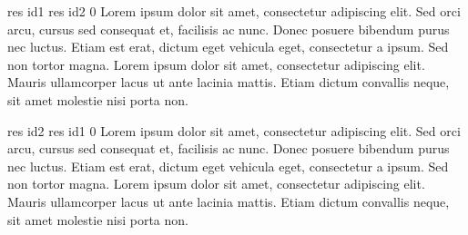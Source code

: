 {
						
		\state res \asig id1			
	\Else
		\state res \asig id2			
	\endif
}
{0}
{Lorem ipsum dolor sit amet, consectetur adipiscing elit. Sed orci arcu, cursus sed consequat et, facilisis ac nunc. Donec posuere bibendum purus nec luctus. Etiam est erat, dictum eget vehicula eget, consectetur a ipsum. Sed non tortor magna. Lorem ipsum dolor sit amet, consectetur adipiscing elit. Mauris ullamcorper lacus ut ante lacinia mattis. Etiam dictum convallis neque, sit amet molestie nisi porta non.}

{
						
		\state res \asig id2			
	\Else
		\state res \asig id1			
	\endif
}
{0}
{Lorem ipsum dolor sit amet, consectetur adipiscing elit. Sed orci arcu, cursus sed consequat et, facilisis ac nunc. Donec posuere bibendum purus nec luctus. Etiam est erat, dictum eget vehicula eget, consectetur a ipsum. Sed non tortor magna. Lorem ipsum dolor sit amet, consectetur adipiscing elit. Mauris ullamcorper lacus ut ante lacinia mattis. Etiam dictum convallis neque, sit amet molestie nisi porta non.}